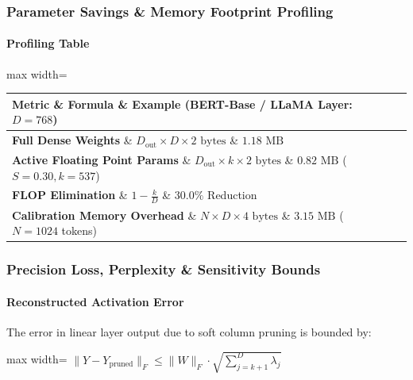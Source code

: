 \subsubsection*{Parameter Savings \& Memory Footprint Profiling}

\paragraph{Profiling Table}

\begin{center}
\begin{adjustbox}{max width=\columnwidth}
\renewcommand{\arraystretch}{1.2}
\begin{tabular}{lll}
\toprule
Metric \& Formula \& Example (BERT-Base / LLaMA Layer: $D=768$) \\
\midrule
\textbf{Full Dense Weights} \& $D_{\text{out}} \times D \times 2 \text{ bytes}$ \& $1.18 \text{ MB}$ \\
\textbf{Active Floating Point Params} \& $D_{\text{out}} \times k \times 2 \text{ bytes}$ \& $0.82 \text{ MB}$ ($S=0.30, k=537$) \\
\textbf{FLOP Elimination} \& $1 - \frac{k}{D}$ \& $\mathbf{30.0\%}$ Reduction \\
\textbf{Calibration Memory Overhead} \& $N \times D \times 4 \text{ bytes}$ \& $3.15 \text{ MB}$ ($N=1024$ tokens) \\

\bottomrule
\end{tabular}
\end{adjustbox}
\end{center}

\subsubsection*{Precision Loss, Perplexity \& Sensitivity Bounds}

\paragraph{Reconstructed Activation Error}

The error in linear layer output due to soft column pruning is bounded by:

\begin{center}
\begin{adjustbox}{max width=\columnwidth}
$\displaystyle
\| Y - Y_{\text{pruned}} \|_F \le \| W \|_F \cdot \sqrt{\sum_{j=k+1}^D \lambda_j}
$
\end{adjustbox}
\end{center}

